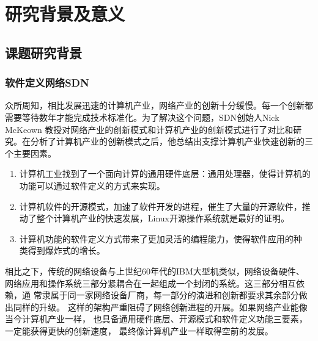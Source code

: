 \section{研究背景及意义}
\subsection{课题研究背景}
\subsubsection{软件定义网络SDN}
众所周知，相比发展迅速的计算机产业，网络产业的创新十分缓慢。每一个创新都 需要等待数年才能完成技术标准化。为了解决这个问题，SDN创始人Nick McKeown 教授对网络产业的创新模式和计算机产业的创新模式进行了对比和研究。在分析了计算机产业的创新模式之后，他总结出支撑计算机产业快速创新的三个主要因素。
\begin{enumerate}
  \item 计算机工业找到了一个面向计算的通用硬件底层：通用处理器，使得计算机的功能可以通过软件定义的方式来实现。
  \item 计算机软件的开源模式，加速了软件开发的进程，催生了大量的开源软件，推动了整个计算机产业的快速发展，Linux开源操作系统就是最好的证明。
  \item 计算机功能的软件定义方式带来了更加灵活的编程能力，使得软件应用的种 类得到爆炸式的增长。
\end{enumerate}

相比之下，传统的网络设备与上世纪60年代的IBM大型机类似，网络设备硬件、 网络应用和操作系统三部分紧耦合在一起组成一个封闭的系统。这三部分相互依赖，通 常隶属于同一家网络设备厂商，每一部分的演进和创新都要求其余部分做出同样的升级。 这样的架构严重阻碍了网络创新进程的开展。如果网络产业能像当今计算机产业一样， 也具备通用硬件底层、开源模式和软件定义功能三要素，一定能获得更快的创新速度， 最终像计算机产业一样取得空前的发展。


